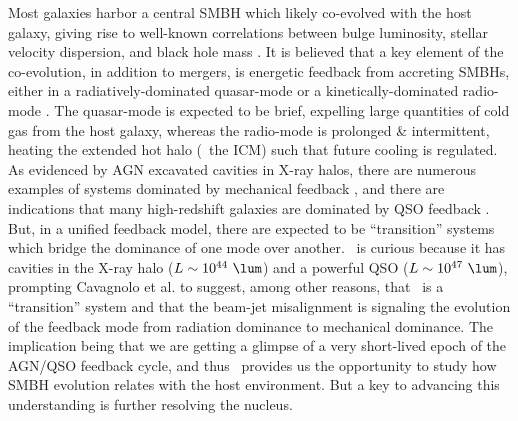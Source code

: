 \documentclass[11pt]{article}
\begin{document}
Most galaxies harbor a central SMBH which likely co-evolved with the
host galaxy, giving rise to well-known correlations between bulge
luminosity, stellar velocity dispersion, and black hole mass
\cite{kormendy95, magorrian}. It is believed that a key element of the
co-evolution, in addition to mergers, is energetic feedback from
accreting SMBHs, either in a radiatively-dominated quasar-mode
\cite[\eg][]{springel05} or a kinetically-dominated radio-mode
\cite[\eg][]{croton06}. The quasar-mode is expected to be brief,
expelling large quantities of cold gas from the host galaxy, whereas
the radio-mode is prolonged \& intermittent, heating the extended hot
halo (\eg\ the ICM) such that future cooling is regulated. As
evidenced by AGN excavated cavities in X-ray halos, there are numerous
examples of systems dominated by mechanical feedback
\cite[\eg][]{fabian00}, and there are indications that many
high-redshift galaxies are dominated by QSO feedback
\cite{veilleux05}. But, in a unified feedback model, there are
expected to be ``transition'' systems which bridge the dominance of
one mode over another. \irs\ is curious because it has cavities in the
X-ray halo ($L \sim 10^{44} ~\lum$) and a powerful QSO ($L \sim
10^{47} ~\lum$), prompting Cavagnolo et al. \cite{cavagnolo10} to
suggest, among other reasons, that \irs\ is a ``transition'' system
and that the beam-jet misalignment is signaling the evolution of the
feedback mode from radiation dominance to mechanical dominance. The
implication being that we are getting a glimpse of a very short-lived
epoch of the AGN/QSO feedback cycle, and thus \irs\ provides us the
opportunity to study how SMBH evolution relates with the host
environment. But a key to advancing this understanding is further
resolving the nucleus.
\end{document}
